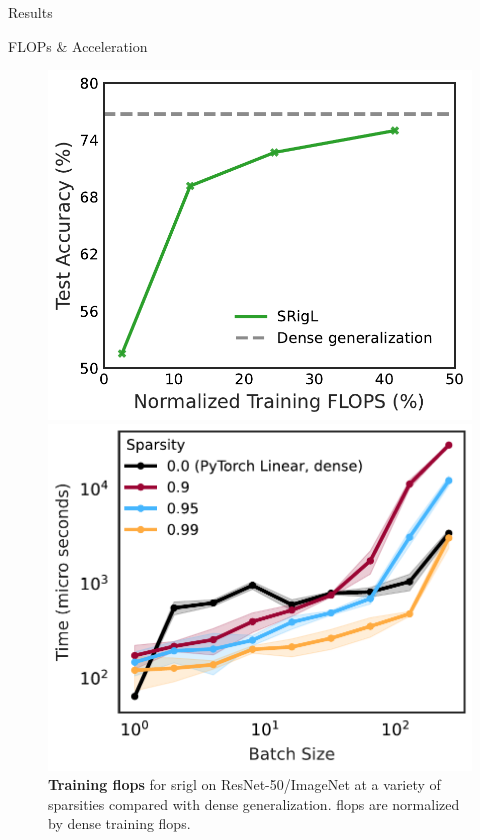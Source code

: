 \documentclass[final]{beamer}
\newlength{\colwidth}
\begin{document}
\begin{frame}[t]
\begin{columns}[t]
\begin{column}{\colwidth}
\begin{block}{Results}
\end{block}

\begin{block}{FLOPs \& Acceleration}

\begin{figure}
    \begin{minipage}[t]{.49\colwidth}
        \centering
        \includegraphics[width=\linewidth]{srigl_example_figs/acc-vs-flops.pdf}
        \caption{\textbf{Training \gls{flops}} for \gls{srigl} on ResNet-50/ImageNet at a variety of sparsities compared with dense generalization. \gls{flops} are normalized by dense training \gls{flops}.}\label{fig:combined-flops}
    \end{minipage}
    \hfill
    \begin{minipage}[t]{.49\colwidth}
        \centering
        \includegraphics[width=\linewidth]{srigl_example_figs/CPU_benchmark.pdf}

\end{minipage}
\end{figure}
\end{block}
\end{column}
\end{columns}
\end{frame}
\end{document}
